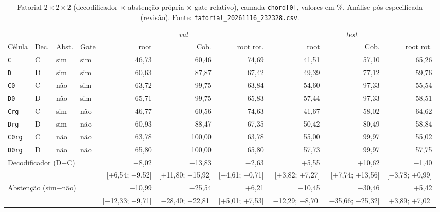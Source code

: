 \begin{table}[t]
  \centering
  \caption{Fatorial $2\times2\times2$ (decodificador $\times$ abstenção própria $\times$ gate relativo), camada \texttt{chord[0]}, valores em \%. Análise pós-especificada (revisão). Fonte: \texttt{fatorial\_20261116\_232328.csv}.}
  \label{tab:fatorial}
  \footnotesize
  \begin{tabular}{llllrrrrrr}
    \toprule
    & & & & \multicolumn{3}{c}{\emph{val}} & \multicolumn{3}{c}{\emph{test}} \\
    \cmidrule(lr){5-7} \cmidrule(lr){8-10}
    Célula & Dec. & Abst. & Gate & root & Cob. & root rot. & root & Cob. & root rot. \\
    \midrule
    \texttt{C} & C & sim & sim & 46,73 & 60,46 & 74,69 & 41,51 & 57,10 & 65,26 \\
    \texttt{D} & D & sim & sim & 60,63 & 87,87 & 67,42 & 49,39 & 77,12 & 59,76 \\
    \texttt{C0} & C & não & sim & 63,72 & 99,75 & 63,84 & 54,60 & 97,33 & 55,54 \\
    \texttt{D0} & D & não & sim & 65,71 & 99,75 & 65,83 & 57,44 & 97,33 & 58,51 \\
    \texttt{Crg} & C & sim & não & 46,77 & 60,56 & 74,63 & 41,67 & 58,02 & 64,62 \\
    \texttt{Drg} & D & sim & não & 60,93 & 88,47 & 67,35 & 50,42 & 80,49 & 58,84 \\
    \texttt{C0rg} & C & não & não & 63,78 & 100,00 & 63,78 & 55,00 & 99,97 & 55,02 \\
    \texttt{D0rg} & D & não & não & 65,80 & 100,00 & 65,80 & 57,73 & 99,97 & 57,75 \\
    \midrule
    \multicolumn{4}{l}{Decodificador (D$-$C)} & +8,02 & +13,83 & $-$2,63 & +5,55 & +10,62 & $-$1,40 \\
    \multicolumn{4}{l}{} & {\scriptsize [+6,54; +9,52]} & {\scriptsize [+11,80; +15,92]} & {\scriptsize [$-$4,61; $-$0,71]} & {\scriptsize [+3,82; +7,27]} & {\scriptsize [+7,74; +13,56]} & {\scriptsize [$-$3,78; +0,99]} \\
    \multicolumn{4}{l}{Abstenção (sim$-$não)} & $-$10,99 & $-$25,54 & +6,21 & $-$10,45 & $-$30,46 & +5,42 \\
    \multicolumn{4}{l}{} & {\scriptsize [$-$12,33; $-$9,71]} & {\scriptsize [$-$28,40; $-$22,81]} & {\scriptsize [+5,01; +7,53]} & {\scriptsize [$-$12,29; $-$8,70]} & {\scriptsize [$-$35,66; $-$25,32]} & {\scriptsize [+3,89; +7,02]} \\

\end{tabular}
\end{table}

